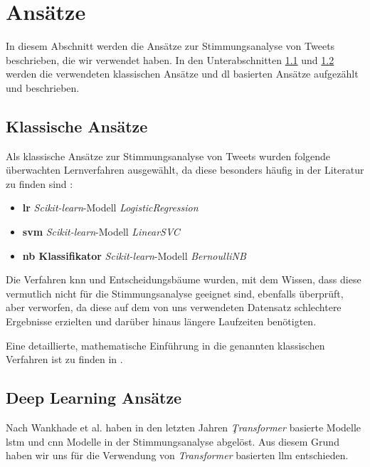 \section{Ansätze}

In diesem Abschnitt werden die Ansätze zur Stimmungsanalyse von Tweets beschrieben, die wir verwendet haben.
In den Unterabschnitten \ref{subsec:klassische-ansaetze} und \ref{subsec:deep-learning-ansaetze} werden die verwendeten klassischen Ansätze und \gls{dl} basierten Ansätze aufgezählt und beschrieben.

\subsection{Klassische Ansätze}\label{subsec:klassische-ansaetze}

Als klassische Ansätze zur Stimmungsanalyse von Tweets wurden folgende überwachten Lernverfahren ausgewählt, da diese besonders häufig in der Literatur zu finden sind \cite{medhat2014sentiment, wankhade2022survey, zimbra2018state}:

\begin{itemize}
    \item \textbf{\gls{lr}} \textit{Scikit-learn}-Modell \textit{LogisticRegression}
    \item \textbf{\gls{svm}} \textit{Scikit-learn}-Modell \textit{LinearSVC}
    \item \textbf{\gls{nb} Klassifikator} \textit{Scikit-learn}-Modell \textit{BernoulliNB}
\end{itemize}

Die Verfahren \gls{knn} und Entscheidungsbäume wurden, mit dem Wissen, dass diese vermutlich nicht für die Stimmungsanalyse geeignet sind, ebenfalls überprüft, aber verworfen, da diese auf dem von uns verwendeten Datensatz schlechtere Ergebnisse erzielten und darüber hinaus längere Laufzeiten benötigten.

Eine detaillierte, mathematische Einführung in die genannten klassischen Verfahren ist zu finden in \cite[vgl. die Kapitel 4.4 für \gls{lr}, 4.5 und 12 für \gls{svm}, 6.6.3 für den \gls{nb} Klassifikator, 13.3 für \gls{knn} und 9.2 für Entscheidungsbäume]{hastie2009elements}.

\subsection{Deep Learning Ansätze}\label{subsec:deep-learning-ansaetze}

Nach Wankhade et al. \cite{wankhade2022survey} haben in den letzten Jahren \textit{Ţransformer} basierte Modelle \gls{lstm} und \gls{cnn} Modelle in der Stimmungsanalyse abgelöst.
Aus diesem Grund haben wir uns für die Verwendung von \textit{Transformer} basierten \gls{llm} entschieden.


